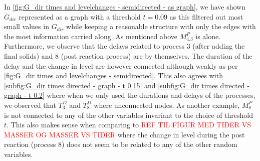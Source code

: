 \documentclass[../Thesis.tex]{subfiles}
\begin{document}
In \autoref{fig:G_dir times and levelchanges - semidirected - as graph}, we have shown $G_{dir}$ represented as a graph with a threshold $t = 0.09$ as this filtered out most small values in $G_{dir}$ while keeping a reasonable structure with only the edges with the most information carried along. As mentioned above $M^P_{4.3}$ is alone. Furthermore, we observe that the delays related to process $3$ (after adding the final solids) and $8$ (post reaction process) are by themselves. The duration of the delay and the change in level are however connected although weakly as per \autoref{fig:G_dir times and levelchanges - semidirected}. This also agrees with \autoref{subfig:G_dir times directed - graph - t 0.15} and \autoref{subfig:G_dir times directed - graph - t 0.2} where when we only used the durations and delays of the processes, we observed that $T^D_3$ and $T^D_8$ where unconnected nodes. As another example, $M^P_8$ is not connected to any of the other variables invariant to the choice of threshold $t$. This also makes sense when comparing to \textcolor{red}{REF TIL FIGUR MED TIDER VS MASSER OG MASSER VS TIDER} where the change in level during the post reaction (process $8$) does not seem to be related to any of the other random variables.
\end{document}
